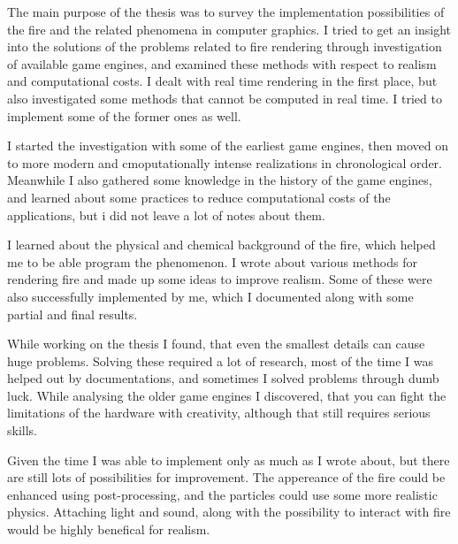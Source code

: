 

The main purpose of the thesis was to survey the implementation possibilities of the fire and the related phenomena in computer graphics. I tried to get an insight into the solutions of the problems related to fire rendering through investigation of available game engines, and examined these methods with respect to realism and computational costs. I dealt with real time rendering in the first place, but also investigated some methods that cannot be computed in real time. I tried to implement some of the former ones as well.

I started the investigation with some of the earliest game engines, then moved on to more modern and cmoputationally intense realizations in chronological order. Meanwhile I also gathered some knowledge in the history of the game engines, and learned about some practices to reduce computational costs of the applications, but i did not leave a lot of notes about them. 

I learned about the physical and chemical background of the fire, which helped me to be able program the phenomenon. I wrote about various methods for rendering fire and made up some ideas to improve realism. Some of these were also successfully implemented by me, which I documented along with some partial and final results.

While working on the thesis I found, that even the smallest details can cause huge problems. Solving these required a lot of research, most of the time I was helped out by documentations, and sometimes I solved problems through dumb luck. While analysing the older game engines I discovered, that you can fight the limitations of the hardware with creativity, although that still requires serious skills.

Given the time I was able to implement only as much as I wrote about, but there are still lots of possibilities for improvement. The appereance of the fire could be enhanced using post-processing, and the particles could use some more realistic physics. Attaching light and sound, along with the possibility to interact with fire would be highly benefical for realism.

